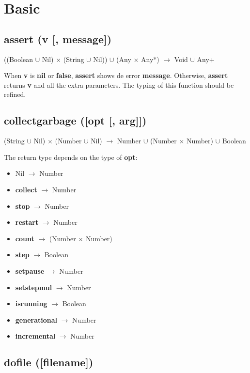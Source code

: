 \documentclass[12pt]{article}
\begin{document}
\newpage

\section{Basic}

\subsection{assert (v [, message])}

((Boolean $\cup$ Nil) $\times$ (String $\cup$ Nil)) $\cup$
(Any $\times$ Any*) $\rightarrow$
Void $\cup$ Any+

When \textbf{v} is \textbf{nil} or \textbf{false}, \textbf{assert}
shows de error \textbf{message}.
Otherwise, \textbf{assert} returns \textbf{v} and all the extra
parameters.
The typing of this function should be refined.

\subsection{collectgarbage ([opt [, arg]])}

(String $\cup$ Nil) $\times$
(Number $\cup$ Nil) $\rightarrow$
Number $\cup$ (Number $\times$ Number) $\cup$ Boolean

The return type depends on the type of \textbf{opt}:
\begin{itemize}
\item Nil $\rightarrow$ Number
\item \textbf{collect} $\rightarrow$ Number
\item \textbf{stop} $\rightarrow$ Number
\item \textbf{restart} $\rightarrow$ Number
\item \textbf{count} $\rightarrow$ (Number $\times$ Number)
\item \textbf{step} $\rightarrow$ Boolean
\item \textbf{setpause} $\rightarrow$ Number
\item \textbf{setstepmul} $\rightarrow$ Number
\item \textbf{isrunning} $\rightarrow$ Boolean
\item \textbf{generational} $\rightarrow$ Number
\item \textbf{incremental} $\rightarrow$ Number
\end{itemize}

\subsection{dofile ([filename])}
\end{document}
